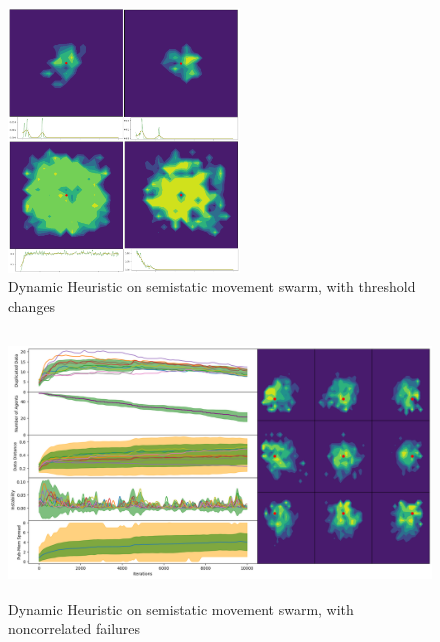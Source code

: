 \documentclass{UoYCSproject}
\begin{document}
\begin{figure}[htb]
\label{fig:Threshold_Changes2}
\begin{center}
\centering
\includegraphics[height=7cm]{"./Dynamic_Heuristic/Thresholdchanges.png"}
\caption{Dynamic Heuristic on semi\-static movement swarm, with threshold changes}
\end{center}
\end{figure}

\begin{figure}[htb]
\label{fig:static_movement_non2}
\begin{center}
\centering
\includegraphics[height=7cm]{"./Dynamic_Heuristic/Static_Move_non.png"}
\caption{Dynamic Heuristic on semi\-static movement swarm, with non\-correlated failures}
\end{center}
\end{figure}
\end{document}
